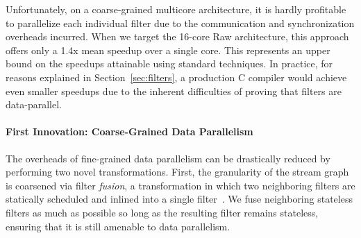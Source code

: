 Unfortunately, on a coarse-grained multicore architecture, it is
hardly profitable to parallelize each individual filter due to the
communication and synchronization overheads incurred.  When we target
the 16-core Raw architecture, this approach offers only a 1.4x mean
speedup over a single core.  This represents an upper bound on the
speedups attainable using standard techniques.  In practice, for
reasons explained in Section~\ref{sec:filters}, a production C
compiler would achieve even smaller speedups due to the inherent
difficulties of proving that filters are data-parallel.

\paragraph*{First Innovation: Coarse-Grained Data Parallelism}  The
overheads of fine-grained data parallelism can be drastically reduced
by performing two novel transformations.  First, the granularity of
the stream graph is coarsened via filter {\it fusion}, a
transformation in which two neighboring filters are statically
scheduled and inlined into a single
filter~\cite{gordon-asplos02,sermulins-lctes05}.  We fuse
neighboring stateless filters as much as possible so long as the
resulting filter remains stateless, ensuring that it is still amenable
to data parallelism.

